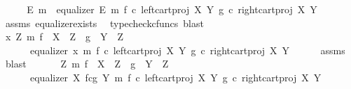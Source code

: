 \begin{isabellebody}
%
\isadelimproof
%
\endisadelimproof
%
\isatagproof
{}\isamarkupfalse%
\ {\isacharminus}{\kern0pt}\isanewline
\ \ \isamarkupfalse%
\ E\ m\ \ {\isachardoublequoteopen}equalizer\ E\ m\ {\isacharparenleft}{\kern0pt}f\ {\isasymcirc}\isactrlsub c\ left{\isacharunderscore}{\kern0pt}cart{\isacharunderscore}{\kern0pt}proj\ X\ Y{\isacharparenright}{\kern0pt}\ {\isacharparenleft}{\kern0pt}g\ {\isasymcirc}\isactrlsub c\ right{\isacharunderscore}{\kern0pt}cart{\isacharunderscore}{\kern0pt}proj\ X\ Y{\isacharparenright}{\kern0pt}{\isachardoublequoteclose}\isanewline
\ \ \ \ \isamarkupfalse%
\ assms\ equalizer{\isacharunderscore}{\kern0pt}exists\ \isamarkupfalse%
\ {\isacharparenleft}{\kern0pt}typecheck{\isacharunderscore}{\kern0pt}cfuncs{\isacharcomma}{\kern0pt}\ blast{\isacharparenright}{\kern0pt}\isanewline
\ \ \isamarkupfalse%
\ \isamarkupfalse%
\ {\isachardoublequoteopen}{\isasymexists}x\ Z\ m{\isachardot}{\kern0pt}\ f\ {\isacharcolon}{\kern0pt}\ X\ {\isasymrightarrow}\ Z\ {\isasymand}\ g\ {\isacharcolon}{\kern0pt}\ Y\ {\isasymrightarrow}\ Z\ {\isasymand}\isanewline
\ \ \ \ \ \ equalizer\ x\ m\ {\isacharparenleft}{\kern0pt}f\ {\isasymcirc}\isactrlsub c\ left{\isacharunderscore}{\kern0pt}cart{\isacharunderscore}{\kern0pt}proj\ X\ Y{\isacharparenright}{\kern0pt}\ {\isacharparenleft}{\kern0pt}g\ {\isasymcirc}\isactrlsub c\ right{\isacharunderscore}{\kern0pt}cart{\isacharunderscore}{\kern0pt}proj\ X\ Y{\isacharparenright}{\kern0pt}{\isachardoublequoteclose}\isanewline
\ \ \ \ \isamarkupfalse%
\ assms\ \isamarkupfalse%
\ blast\isanewline
\ \ \isamarkupfalse%
\ \isamarkupfalse%
\ {\isachardoublequoteopen}{\isasymexists}\ Z\ m{\isachardot}{\kern0pt}\ f\ {\isacharcolon}{\kern0pt}\ X\ {\isasymrightarrow}\ Z\ {\isasymand}\ g\ {\isacharcolon}{\kern0pt}\ Y\ {\isasymrightarrow}\ Z\ {\isasymand}\ \isanewline
\ \ \ \ \ \ equalizer\ {\isacharparenleft}{\kern0pt}X\ \isactrlbsub f\isactrlesub {\isasymtimes}\isactrlsub c\isactrlbsub g\isactrlesub \ Y{\isacharparenright}{\kern0pt}\ m\ {\isacharparenleft}{\kern0pt}f\ {\isasymcirc}\isactrlsub c\ left{\isacharunderscore}{\kern0pt}cart{\isacharunderscore}{\kern0pt}proj\ X\ Y{\isacharparenright}{\kern0pt}\ {\isacharparenleft}{\kern0pt}g\ {\isasymcirc}\isactrlsub c\ right{\isacharunderscore}{\kern0pt}cart{\isacharunderscore}{\kern0pt}proj\ X\ Y{\isacharparenright}{\kern0pt}{\isachardoublequoteclose}\isanewline
\ \ \ \ \isamarkupfalse%

\end{isabellebody}
